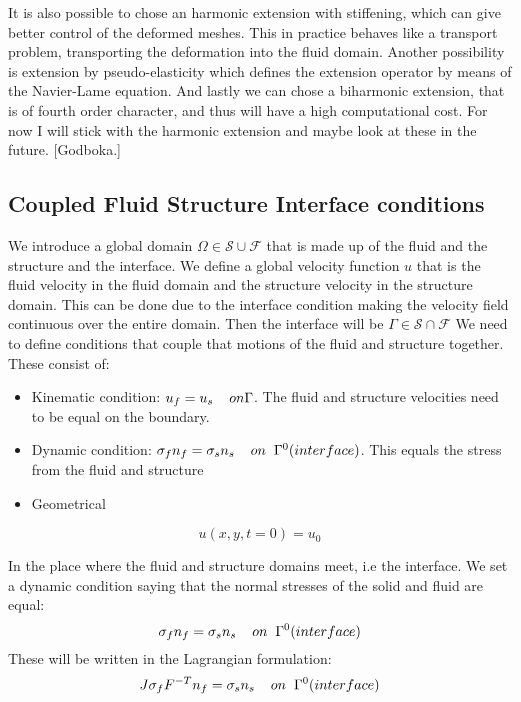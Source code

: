 It is also possible to chose an harmonic extension with stiffening, which can give better control of the deformed meshes. This in practice behaves like a transport problem, transporting the deformation into the fluid domain. Another possibility is extension by pseudo-elasticity which defines the extension operator by means of the Navier-Lame equation. And lastly we can chose a biharmonic extension, that is of fourth order character, and thus will have a high computational cost. For now I will stick with the harmonic extension and maybe look at these in the future. [Godboka.]

\subsection*{Coupled Fluid Structure Interface conditions}
We introduce a global domain $\Omega \in \mathcal{S} \cup \mathcal{F} $ that is made up of the fluid and the structure and the interface. We define a global velocity function $u$ that is the fluid velocity in the fluid domain and the structure velocity in the structure domain. This can be done due to the interface condition making the velocity field continuous over the entire domain. Then the interface will be $ \Gamma \in \mathcal{S} \cap \mathcal{F}  $  
We need to define conditions that couple that motions of the fluid and structure together. These consist of:
\begin{itemize}
\item Kinematic condition: $u_f = u_s  \hspace{4mm} on \Gamma$. The fluid and structure velocities need to be equal on the boundary. 
\item Dynamic condition: $  \sigma_f n_f = \sigma_s n_s \hspace{4mm} on  \hspace{2mm}\Gamma^0 (interface)   $. This equals the stress from the fluid and structure 
\item Geometrical 
\end{itemize}






$$  u(x,y,t=0) = u_0   $$

In the place where the fluid and structure domains meet, i.e the interface. We set a dynamic condition saying that the normal stresses of the solid and fluid are equal:
$$  \sigma_f n_f = \sigma_s n_s \hspace{4mm} on  \hspace{2mm}\Gamma^0 (interface)   $$
These will be written in the Lagrangian formulation:
$$  J\sigma_f F^{-T} n_f = \sigma_s  n_s \hspace{4mm} on  \hspace{2mm}\Gamma^0 (interface)   $$




